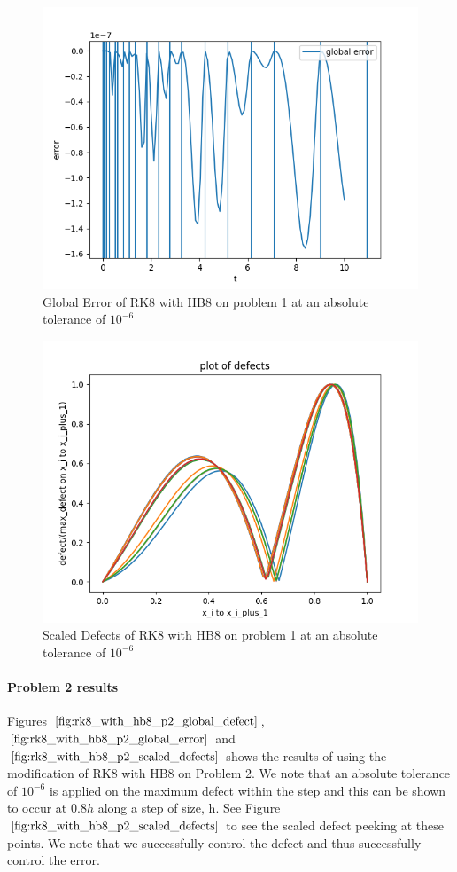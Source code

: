 \documentclass{article}
\begin{document}
\begin{figure}[H]
\centering
\includegraphics[width=0.7\linewidth]{./figures/rk8_with_hb8_p1_global_error}
\caption{Global Error of RK8 with HB8 on problem 1 at an absolute tolerance of $10^{-6}$}
\label{fig:rk8_with_hb8_p1_global_error}
\end{figure}

\begin{figure}[H]
\centering
\includegraphics[width=0.7\linewidth]{./figures/rk8_with_hb8_p1_scaled_defects}
\caption{Scaled Defects of RK8 with HB8 on problem 1 at an absolute tolerance of $10^{-6}$}
\label{fig:rk8_with_hb8_p1_scaled_defects}
\end{figure}

\paragraph{Problem 2 results}
Figures $\ref{fig:rk8_with_hb8_p2_global_defect}$, $\ref{fig:rk8_with_hb8_p2_global_error}$ and $\ref{fig:rk8_with_hb8_p2_scaled_defects}$ shows the results of using the modification of RK8 with HB8 on Problem 2. We note that an absolute tolerance of $10^{-6}$ is applied on the maximum defect within the step and this can be shown to occur at $0.8h$ along a step of size, h. See Figure $\ref{fig:rk8_with_hb8_p2_scaled_defects}$ to see the scaled defect peeking at these points. We note that we successfully control the defect and thus successfully control the error.
\end{document}
